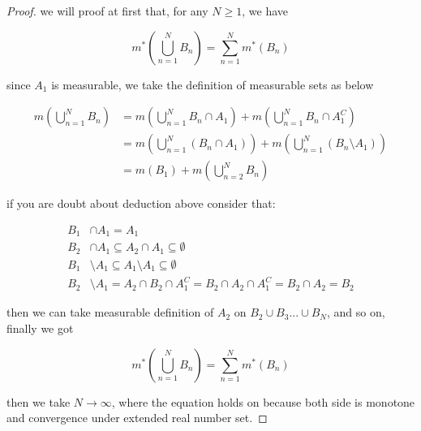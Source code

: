 \documentclass[11pt,a4paper]{article}
\begin{document}
\begin{proof}
    we will proof at first that, for any $N \ge 1$, we have

    \[
        m^*(\bigcup_{n=1}^{N}B_n) = \sum_{n=1}^{N}m^*(B_n)
    \]

    since $A_1$ is measurable, we take the definition of measurable sets as below

    \begin{align*}
        m(\bigcup_{n=1}^{N}B_n) &= m(\bigcup_{n=1}^{N}B_n \cap A_1)  + m(\bigcup_{n=1}^{N}B_n \cap A_1^C) \\
        &= m(\bigcup_{n=1}^{N}\left(B_n \cap A_1 \right)) + m(\bigcup_{n=1}^{N}\left( B_n \setminus A_1 \right))\\
        &= m(B_1) + m(\bigcup_{n=2}^{N}B_n)
    \end{align*}

    if you are doubt about deduction above consider that:

    \begin{align*}
        B_1 & \cap A_1 = A_1 \\
        B_2 & \cap A_1 \subseteq A_2 \cap A_1 \subseteq \emptyset \\
        B_1 & \setminus A_1 \subseteq A_1 \setminus A_1 \subseteq \emptyset \\
        B_2 & \setminus A_1 = A_2 \cap B_2 \cap A_1^C = B_2 \cap A_2  \cap A_1^C = B_2 \cap A_2 = B_2
    \end{align*}

    then we can take measurable definition of $A_2$ on $B_2 \cup B_3 ... \cup B_N$, and so on, finally we got

    \[
        m^*(\bigcup_{n=1}^{N}B_n) = \sum_{n=1}^{N}m^*(B_n)
    \]

    then we take $N \to \infty$, where the equation holds on because both side is monotone and convergence
    under extended real number set.
    
\end{proof}
\end{document}
